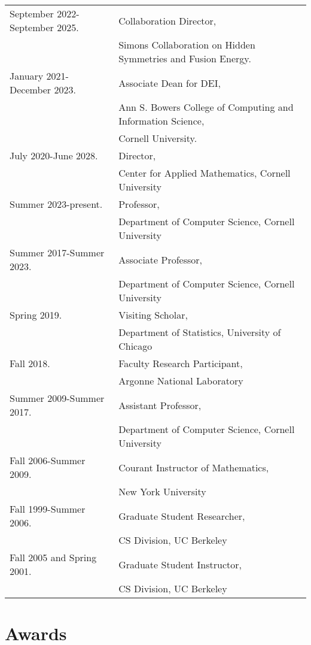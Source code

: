 \documentclass{article}
\begin{document}
\begin{tabular}{ll}
  September 2022-September 2025.
    & Collaboration Director,\\
    & Simons Collaboration on Hidden Symmetries and Fusion Energy. \\
  January 2021-December 2023.
    & Associate Dean for DEI, \\
    & Ann S. Bowers College of Computing and Information Science, \\
    & Cornell University. \\
  July 2020-June 2028.
    & Director, \\
    & Center for Applied Mathematics, Cornell University \\
  Summer 2023-present.
    & Professor, \\
    & Department of Computer Science, Cornell University \\
  Summer 2017-Summer 2023.
    & Associate Professor, \\
    & Department of Computer Science, Cornell University \\
  Spring 2019.
    & Visiting Scholar, \\
    & Department of Statistics, University of Chicago \\
  Fall 2018.
    & Faculty Research Participant, \\
    & Argonne National Laboratory \\
  Summer 2009-Summer 2017.
    & Assistant Professor, \\
    & Department of Computer Science, Cornell University \\
  Fall 2006-Summer 2009.
    & Courant Instructor of Mathematics, \\
    & New York University \\
  Fall 1999-Summer 2006.
    & Graduate Student Researcher, \\
    & CS Division, UC Berkeley \\
  Fall 2005 and Spring 2001.
    & Graduate Student Instructor, \\
    & CS Division, UC Berkeley
\end{tabular}


\section*{Awards}


\end{document}
